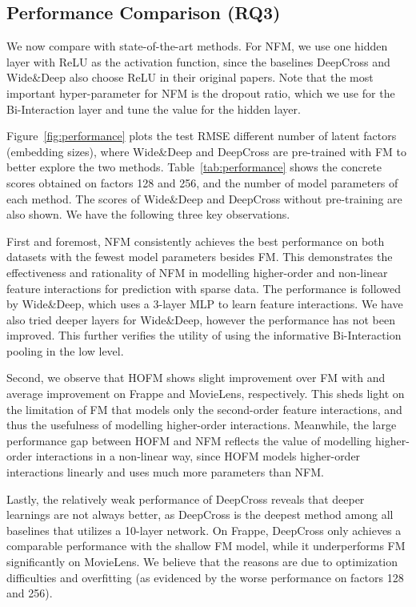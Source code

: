 \subsection{Performance Comparison (RQ3)}
\label{ss:performance_comparison}
We now compare with state-of-the-art methods. 
For NFM, we use one hidden layer with ReLU as the activation function, since the baselines DeepCross and Wide\&Deep also choose ReLU in their original papers. Note that the most important hyper-parameter for NFM is the dropout ratio, which we use  for the Bi-Interaction layer and tune the value for the hidden layer. 

Figure~\ref{fig:performance} plots the test RMSE \wrt different number of latent factors (\ie embedding sizes), where Wide\&Deep and DeepCross are pre-trained with FM to better explore the two methods. 
Table~\ref{tab:performance} shows the concrete scores obtained on factors 128 and 256, and the number of model parameters of each method. The scores of Wide\&Deep and DeepCross without pre-training are also shown. We have the following three key observations. 

First and foremost, NFM consistently achieves the best performance on both datasets with the fewest model parameters besides FM. This demonstrates the effectiveness and rationality of NFM in modelling higher-order and non-linear feature interactions for prediction with sparse data. 
The performance is followed by Wide\&Deep, which uses a 3-layer MLP to learn feature interactions. We have also tried deeper layers for Wide\&Deep, however the performance has not been improved. This further verifies the utility of using the informative Bi-Interaction pooling in the low level. 

Second, we observe that HOFM shows slight improvement over FM with  and  average improvement on Frappe and MovieLens, respectively. This sheds light on the limitation of FM that models only the second-order feature interactions, and thus the usefulness of modelling higher-order interactions. Meanwhile, the large performance gap between HOFM and NFM reflects the value of modelling higher-order interactions in a non-linear way, since HOFM models higher-order interactions linearly and uses much more parameters than NFM. 

Lastly, the relatively weak performance of DeepCross reveals that deeper learnings are not always better, as DeepCross is the deepest method among all baselines that utilizes a 10-layer network. 
On Frappe, DeepCross only achieves a comparable performance with the shallow FM model, while it underperforms FM significantly on MovieLens. 
We believe that the reasons are due to optimization difficulties and overfitting (as evidenced by the worse performance on factors 128 and 256). \\\vspace{-8pt}

